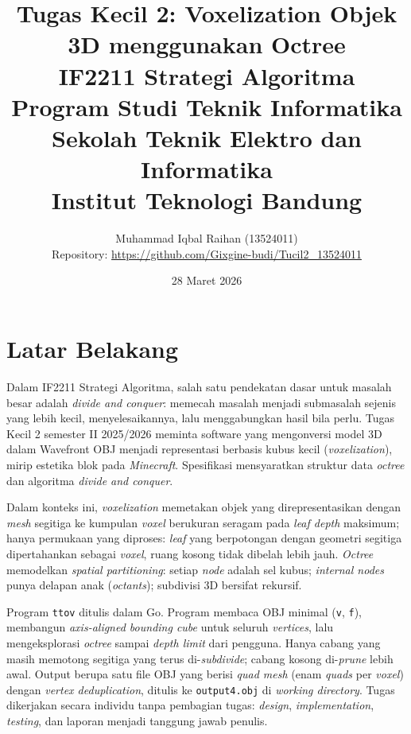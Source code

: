 \documentclass[11pt,a4paper]{article}
\title{
    Tugas Kecil 2: Voxelization Objek 3D menggunakan Octree \\
    \large IF2211 Strategi Algoritma \\
    \large Program Studi Teknik Informatika \\
    \large Sekolah Teknik Elektro dan Informatika \\
    \large Institut Teknologi Bandung
}
\author{
    Muhammad Iqbal Raihan (13524011) \\[0.3cm]
    Repository: \url{https://github.com/Gixgine-budi/Tucil2_13524011}
}
\date{28 Maret 2026}
\begin{document}
\maketitle
\newpage
\tableofcontents
\newpage

\section{Latar Belakang}

Dalam IF2211 Strategi Algoritma, salah satu pendekatan dasar untuk masalah besar adalah \textit{divide and conquer}: memecah masalah menjadi submasalah sejenis yang lebih kecil, menyelesaikannya, lalu menggabungkan hasil bila perlu. Tugas Kecil 2 semester II 2025/2026 meminta software yang mengonversi model 3D dalam Wavefront OBJ menjadi representasi berbasis kubus kecil (\textit{voxelization}), mirip estetika blok pada \textit{Minecraft}. Spesifikasi mensyaratkan struktur data \textit{octree} dan algoritma \textit{divide and conquer}.

Dalam konteks ini, \textit{voxelization} memetakan objek yang direpresentasikan dengan \textit{mesh} segitiga ke kumpulan \textit{voxel} berukuran seragam pada \textit{leaf depth} maksimum; hanya permukaan yang diproses: \textit{leaf} yang berpotongan dengan geometri segitiga dipertahankan sebagai \textit{voxel}, ruang kosong tidak dibelah lebih jauh. \textit{Octree} memodelkan \textit{spatial partitioning}: setiap \textit{node} adalah sel kubus; \textit{internal nodes} punya delapan anak (\textit{octants}); subdivisi 3D bersifat rekursif.

Program \texttt{ttov} ditulis dalam Go. Program membaca OBJ minimal (\texttt{v}, \texttt{f}), membangun \textit{axis-aligned bounding cube} untuk seluruh \textit{vertices}, lalu mengeksplorasi \textit{octree} sampai \textit{depth limit} dari pengguna. Hanya cabang yang masih memotong segitiga yang terus di-\textit{subdivide}; cabang kosong di-\textit{prune} lebih awal. Output berupa satu file OBJ yang berisi \textit{quad mesh} (enam \textit{quads} per \textit{voxel}) dengan \textit{vertex deduplication}, ditulis ke \texttt{output4.obj} di \textit{working directory}. Tugas dikerjakan secara individu tanpa pembagian tugas: \textit{design}, \textit{implementation}, \textit{testing}, dan laporan menjadi tanggung jawab penulis.

\end{document}

